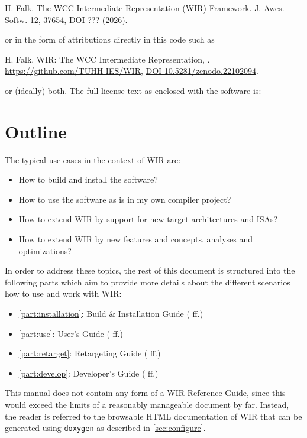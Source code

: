 \hfill\begin{minipage}{\dimexpr\textwidth-1cm}
  H. Falk. The WCC Intermediate Representation (WIR) Framework.
  J. Awes. Softw. 12, 37654, DOI ??? (2026).
\end{minipage}

or in the form of attributions directly in this code such as

\hfill\begin{minipage}{\dimexpr\textwidth-1cm}
  H. Falk. WIR: The WCC Intermediate Representation, \WIRVERSION.
  \href{https://github.com/TUHH-IES/WIR}{https://github.com/TUHH-IES/WIR}, \href{https://doi.org/10.5281/zenodo.22102094}{DOI 10.5281/zenodo.22102094}.
\end{minipage}

or (ideally) both. The full license text as enclosed with the software is:



\section{Outline}
\label{sec:outline}

The typical use cases in the context of \gls{WIR} are:
\begin{itemize}
  \item How to build and install the software?
  \item How to use the software as is in my own compiler project?
  \item How to extend \gls{WIR} by support for new target architectures and \glspl{ISA}?
  \item How to extend \gls{WIR} by new features and concepts, analyses and optimizations?
\end{itemize}

In order to address these topics, the rest of this document is structured into the following parts which aim to provide more details about the different scenarios how to use and work with \gls{WIR}:
\begin{itemize}
  \item \cref{part:installation}: Build \& Installation Guide ( ff.)
  \item \cref{part:use}: User's Guide ( ff.)
  \item \cref{part:retarget}: Retargeting Guide ( ff.)
  \item \cref{part:develop}: Developer's Guide ( ff.)
\end{itemize}

This manual does not contain any form of a \gls{WIR} Reference Guide, since this would exceed the limits of a reasonably manageable document by far.
Instead, the reader is referred to the browsable HTML documentation of \gls{WIR} that can be generated using \texttt{doxygen} as described in \cref{sec:configure}.

\cleardoubleoddpage
